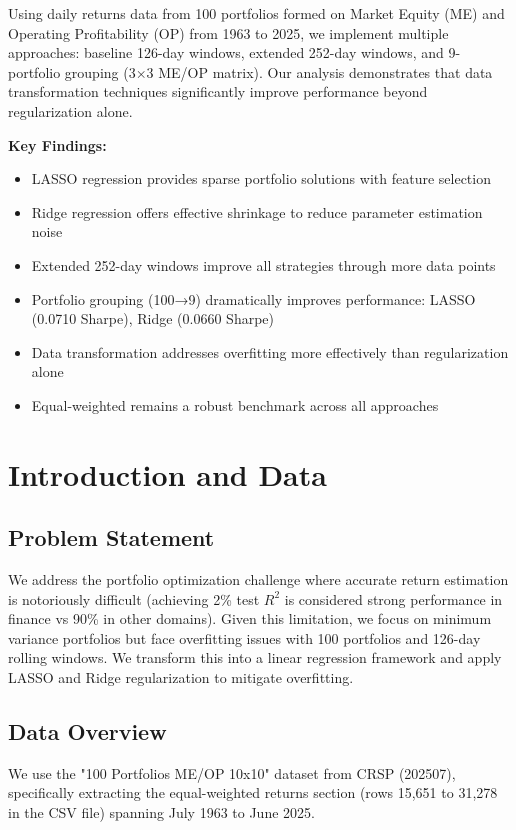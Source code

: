 \documentclass[12pt]{article}
\begin{document}
Using daily returns data from 100 portfolios formed on Market Equity (ME) and Operating Profitability (OP) from 1963 to 2025, we implement multiple approaches: baseline 126-day windows, extended 252-day windows, and 9-portfolio grouping (3×3 ME/OP matrix). Our analysis demonstrates that data transformation techniques significantly improve performance beyond regularization alone.

\textbf{Key Findings:}
\begin{itemize}
    \item LASSO regression provides sparse portfolio solutions with feature selection
    \item Ridge regression offers effective shrinkage to reduce parameter estimation noise
    \item Extended 252-day windows improve all strategies through more data points
    \item Portfolio grouping (100→9) dramatically improves performance: LASSO (0.0710 Sharpe), Ridge (0.0660 Sharpe)
    \item Data transformation addresses overfitting more effectively than regularization alone
    \item Equal-weighted remains a robust benchmark across all approaches
\end{itemize}

\section{Introduction and Data}

\subsection{Problem Statement}
We address the portfolio optimization challenge where accurate return estimation is notoriously difficult (achieving 2\% test $R^2$ is considered strong performance in finance vs 90\% in other domains). Given this limitation, we focus on minimum variance portfolios but face overfitting issues with 100 portfolios and 126-day rolling windows. We transform this into a linear regression framework and apply LASSO and Ridge regularization to mitigate overfitting.

\subsection{Data Overview}
We use the "100 Portfolios ME/OP 10x10" dataset from CRSP (202507), specifically extracting the equal-weighted returns section (rows 15,651 to 31,278 in the CSV file) spanning July 1963 to June 2025.
\end{document}
